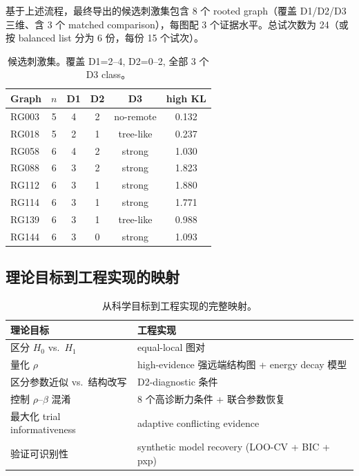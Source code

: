 \documentclass[11pt,a4paper]{ctexart}
\begin{document}
基于上述流程，最终导出的候选刺激集包含 8 个 rooted graph（覆盖 D1/D2/D3 三维、含 3 个 matched comparison），每图配 3 个证据水平。总试次数为 24（或按 balanced list 分为 6 份，每份 15 个试次）。

\begin{table}[H]
\centering\small
\begin{tabular}{lccccc}
\toprule
Graph & $n$ & D1 & D2 & D3 & high KL \\
\midrule
RG003 & 5 & 4 & 2 & no-remote & 0.132 \\
RG018 & 5 & 2 & 1 & tree-like & 0.237 \\
RG058 & 6 & 4 & 2 & strong & 1.030 \\
RG088 & 6 & 3 & 2 & strong & 1.823 \\
RG112 & 6 & 3 & 1 & strong & 1.880 \\
RG114 & 6 & 3 & 1 & strong & 1.771 \\
RG139 & 6 & 3 & 1 & tree-like & 0.988 \\
RG144 & 6 & 3 & 0 & strong & 1.093 \\
\bottomrule
\end{tabular}
\caption{候选刺激集。覆盖 D1=2--4, D2=0--2, 全部 3 个 D3 class。}
\end{table}

\subsection{理论目标到工程实现的映射}

\begin{table}[H]
\centering\small
\begin{tabular}{ll}
\toprule
理论目标 & 工程实现 \\
\midrule
区分 $H_0$ vs.\ $H_1$ & equal-local 图对 \\
量化 $\rho$ & high-evidence 强远端结构图 + energy decay 模型 \\
区分参数近似 vs.\ 结构改写 & D2-diagnostic 条件 \\
控制 $\rho$--$\beta$ 混淆 & 8 个高诊断力条件 + 联合参数恢复 \\
最大化 trial informativeness & adaptive conflicting evidence \\
验证可识别性 & synthetic model recovery (LOO-CV + BIC + pxp) \\
\bottomrule
\end{tabular}
\caption{从科学目标到工程实现的完整映射。}
\end{table}


\end{document}
